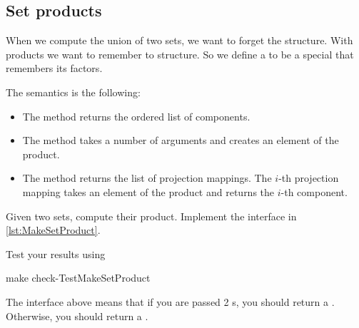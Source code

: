 \subsection{Set products}

When we compute the union of two sets, we want to forget the structure.
With products we want to remember to structure.
So we define a  to be a special \Setoid that remembers its factors.


The semantics is the following:
\begin{itemize}
    \item The method  returns the ordered list of components.
    \item The method  takes a number of arguments and creates an element of the product.
    \item The method  returns the list of projection mappings.
          The $i$-th projection mapping takes an element of the product and returns the $i$-th component.

\end{itemize}

\begin{codeexercise}
    Given two sets, compute their product.
    Implement the interface in \cref{lst:MakeSetProduct}.

    Test your results using

    \begin{console}
        make check-TestMakeSetProduct
    \end{console}

\end{codeexercise}


The interface above means that if you are passed 2 \FiniteSet{}s, you should return a \FiniteSet.
Otherwise, you should return a \Setoid.


%

%

